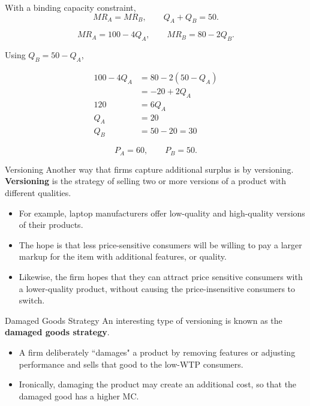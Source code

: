 \documentclass{beamer}
\begin{document}
\begin{frame}[shrink]
\setlength{\abovedisplayskip}{2pt}
\setlength{\belowdisplayskip}{2pt}
\setlength{\abovedisplayshortskip}{2pt}
\setlength{\belowdisplayshortskip}{2pt}

With a binding capacity constraint,
\[
MR_A=MR_B,
\qquad
Q_A+Q_B=50.
\]

\[
MR_A=100-4Q_A,
\qquad
MR_B=80-2Q_B.
\]

Using \(Q_B=50-Q_A\),

\begin{align*}
100-4Q_A &= 80-2(50-Q_A)\\
         &= -20+2Q_A\\
120      &= 6Q_A\\
Q_A      &= 20\\
Q_B      &= 50-20=30
\end{align*}

\[
P_A=60,
\qquad
P_B=50.
\]

\begin{center}
\end{center}

\end{frame}

\begin{frame}{Versioning}
  Another way that firms capture additional surplus is by versioning. \textbf{Versioning} is the strategy of selling two or more versions of a product with different qualities.

  \begin{itemize}
    \item For example, laptop manufacturers offer low-quality and high-quality versions of their products.
    
    \item The hope is that less price-sensitive consumers will be willing to pay a larger markup for the item with additional features, or quality.
    
    \item Likewise, the firm hopes that they can attract price sensitive consumers with a lower-quality product, without causing the price-insensitive consumers to switch.
  \end{itemize}


\end{frame}

\begin{frame}{Damaged Goods Strategy}
  An interesting type of versioning is known as the \textbf{damaged goods strategy}.

  \begin{itemize}
    \item A firm deliberately ``damages" a product by removing features or adjusting performance and sells that good to the low-WTP consumers.
    
    \item Ironically, damaging the product may create an additional cost, so that the damaged good has a higher MC.
  \end{itemize}
\end{frame}
\end{document}
